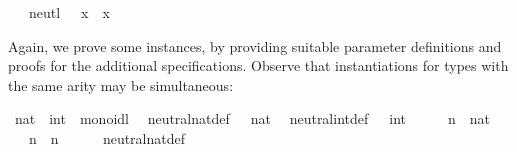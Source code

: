 \begin{isabellebody}
\ \ \ neutl{}\ {}{}\ {}\ x\ {}\ x{}%
\endisatagquote
{\isafoldquote}%
%
\isadelimquote
%
\endisadelimquote
%
\begin{isamarkuptext}%
\noindent Again, we prove some instances, by providing suitable
  parameter definitions and proofs for the additional specifications.
  Observe that instantiations for types with the same arity may be
  simultaneous:%
\end{isamarkuptext}%
\isamarkuptrue%
%
\isadelimquote
%
\endisadelimquote
%
\isatagquote
{}\isamarkupfalse%
\ nat\ \ int\ {}{}\ monoidl\isanewline
{}\isanewline
\isanewline
{}\isamarkupfalse%
\isanewline
\ \ neutral{}nat{}def{}\ {}{}\ {}\ {}{}{}nat{}{}\isanewline
\isanewline
{}\isamarkupfalse%
\isanewline
\ \ neutral{}int{}def{}\ {}{}\ {}\ {}{}{}int{}{}\isanewline
\isanewline
{}\isamarkupfalse%
\ \isamarkupfalse%
\isanewline
\ \ \isamarkupfalse%
\ n\ {}{}\ nat\isanewline
\ \ \isamarkupfalse%
\ {}{}\ {}\ n\ {}\ n{}\isanewline
\ \ \ \ \isamarkupfalse%
\ neutral{}nat{}def\ \isamarkupfalse%

\end{isabellebody}
